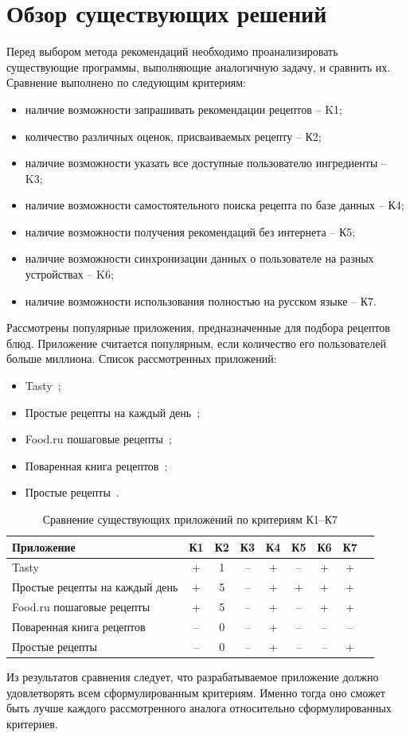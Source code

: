 \section{Обзор существующих решений}
Перед выбором метода рекомендаций необходимо проанализировать существующие программы, выполняющие аналогичную задачу, и сравнить их.
Сравнение выполнено по следующим критериям:
\begin{itemize}
    \item наличие возможности запрашивать рекомендации рецептов -- K1;
    \item количество различных оценок, присваиваемых рецепту -- К2;
    \item наличие возможности указать все доступные пользователю ингредиенты -- K3;
    \item наличие возможности самостоятельного поиска рецепта по базе данных -- К4;
    \item наличие возможности получения рекомендаций без интернета -- К5;
    \item наличие возможности синхронизации данных о пользователе на разных устройствах -- K6;
    \item наличие возможности использования полностью на русском языке -- К7.
\end{itemize}

Рассмотрены популярные приложения, предназначенные для подбора рецептов блюд.
Приложение считается популярным, если количество его пользователей больше миллиона.
Список рассмотренных приложений:
\begin{itemize}
    \item Tasty~\cite{app_tasty};
    \item Простые рецепты на каждый день~\cite{app_easyrecipes};
    \item Food.ru пошаговые рецепты~\cite{app_foodru};
    \item Поваренная книга рецептов~\cite{app_cookbook};
    \item Простые рецепты~\cite{app_simple_recipes}.
\end{itemize}

\begin{table}[h]
\centering
\caption{ \centering Сравнение существующих приложений по критериям К1--К7}
\label{tab:overview}
\begin{tabular}{|l|c|c|c|c|c|c|c|c}
\hline
\textbf{Приложение} & \textbf{К1} & \textbf{К2} & \textbf{К3} & \textbf{К4} & \textbf{К5} & \textbf{К6} & \textbf{К7} \\
\hline
Tasty & + & 1 & -- & + & -- & + & + \\
\hline
Простые рецепты на каждый день & + & 5 & -- & + & + & + & + \\
\hline
Food.ru пошаговые рецепты & + & 5 & -- & + & -- & + & + \\
\hline
Поваренная книга рецептов & -- & 0 & -- & + & -- & -- & -- \\
\hline
Простые рецепты & -- & 0 & -- & + & -- & -- & + \\
\hline
\end{tabular}
\end{table}

Из результатов сравнения следует, что разрабатываемое приложение должно удовлетворять всем сформулированным критериям.
Именно тогда оно сможет быть лучше каждого рассмотренного аналога относительно сформулированных критериев.